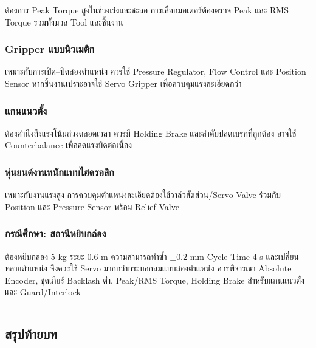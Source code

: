 ต้องการ Peak Torque สูงในช่วงเร่งและชะลอ การเลือกมอเตอร์ต้องตรวจ Peak และ RMS Torque รวมทั้งมวล Tool และชิ้นงาน

\subsubsection{Gripper แบบนิวเมติก}

เหมาะกับการเปิด–ปิดสองตำแหน่ง ควรใช้ Pressure Regulator, Flow Control และ Position Sensor หากชิ้นงานเปราะอาจใช้ Servo Gripper เพื่อควบคุมแรงละเอียดกว่า

\subsubsection{แกนแนวตั้ง}

ต้องคำนึงถึงแรงโน้มถ่วงตลอดเวลา ควรมี Holding Brake และลำดับปลดเบรกที่ถูกต้อง อาจใช้ Counterbalance เพื่อลดแรงบิดต่อเนื่อง

\subsubsection{หุ่นยนต์งานหนักแบบไฮดรอลิก}

เหมาะกับงานแรงสูง การควบคุมตำแหน่งละเอียดต้องใช้วาล์วสัดส่วน/Servo Valve ร่วมกับ Position และ Pressure Sensor พร้อม Relief Valve

\subsubsection{กรณีศึกษา: สถานีหยิบกล่อง}

ต้องหยิบกล่อง 5 kg ระยะ 0.6 m ความสามารถทำซ้ำ $\pm0.2$ mm Cycle Time 4 s และเปลี่ยนหลายตำแหน่ง จึงควรใช้ Servo มากกว่ากระบอกลมแบบสองตำแหน่ง ควรพิจารณา Absolute Encoder, ชุดเกียร์ Backlash ต่ำ, Peak/RMS Torque, Holding Brake สำหรับแกนแนวตั้ง และ Guard/Interlock

\par\noindent\rule{\textwidth}{0.4pt}\par

\subsection{สรุปท้ายบท}

